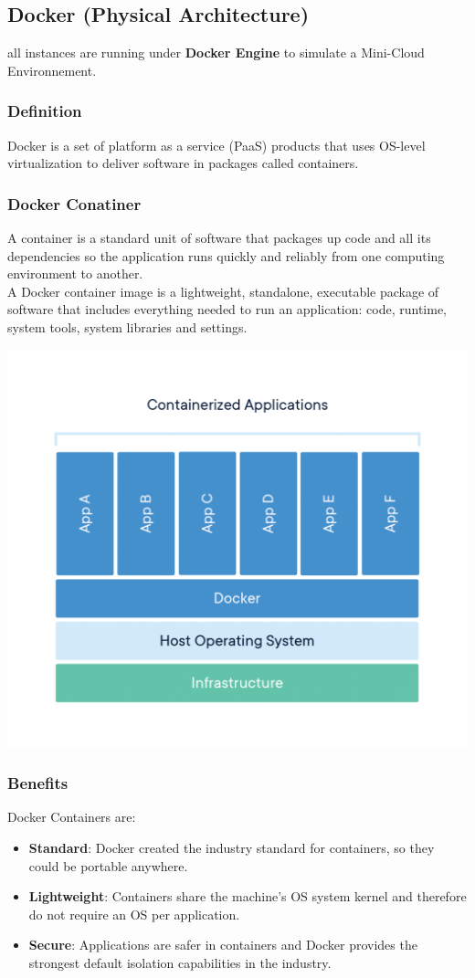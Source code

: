 \subsection{Docker (Physical Architecture)}
all instances are running under \textbf{Docker Engine} to simulate a Mini-Cloud Environnement.
\subsubsection{Definition}
Docker is a set of platform as a service (PaaS) products that uses OS-level virtualization to deliver software in packages called containers.
\subsubsection{Docker Conatiner}
A container is a standard unit of software that packages up code and all its dependencies so the application runs quickly and reliably from one computing environment to another. \\A Docker container image is a lightweight, standalone, executable package of software that includes everything needed to run an application: code, runtime, system tools, system libraries and settings.
\begin{center}
    \includegraphics[scale=0.2]{images/container.png}
\end{center}
\subsubsection{Benefits}
Docker Containers are:
\begin{itemize}
    \item \textbf{Standard}: Docker created the industry standard for containers, so they could be portable anywhere.
    \item \textbf{Lightweight}: Containers share the machine’s OS system kernel and therefore do not require an OS per application.
    \item \textbf{Secure}:  Applications are safer in containers and Docker provides the strongest default isolation capabilities in the industry.
\end{itemize}

